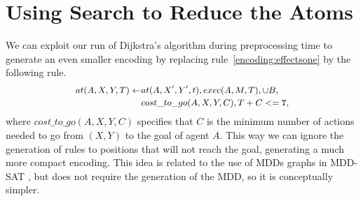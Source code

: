 \section{Using Search to Reduce the Atoms}
We can exploit our run of Dijkstra's algorithm during preprocessing time to generate an even smaller encoding by replacing rule~\ref{encoding:effectsone} by the following rule.
\begin{equation}\small
  \begin{split}
    at(A,X,Y,T) \leftarrow &at(A,X',Y',t), exec(A,M,T), \cup B, \\
    &cost\_to\_go(A,X,Y,C), T + C <= \mathtt{T},
  \end{split}
\end{equation}
where $cost\_to\_go(A,X,Y,C)$ specifies that $C$ is the minimum number of actions needed to go from $(X,Y)$ to the goal of agent $A$. This way we can ignore the generation of rules to positions that will not reach the goal, generating a much more compact encoding. This idea is related to the use of MDDs graphs in MDD-SAT \cite{SurynekFSB16}, but does not require the generation of the MDD, so it is conceptually simpler.
